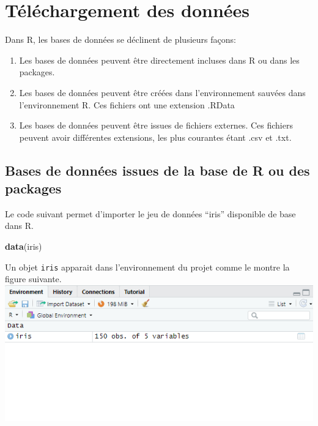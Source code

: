 \documentclass[
]{book}
\newenvironment{Shaded}{\begin{snugshade}}{\end{snugshade}}
\newcommand{\FunctionTok}[1]{\textcolor[rgb]{0.13,0.29,0.53}{\textbf{#1}}}
\newcommand{\NormalTok}[1]{#1}
\providecommand{\tightlist}{%
  \setlength{\itemsep}{0pt}\setlength{\parskip}{0pt}}
\begin{document}
\section{Téléchargement des données}\label{tuxe9luxe9chargement-des-donnuxe9es}

Dans R, les bases de données se déclinent de plusieurs façons:

\begin{enumerate}
\def\labelenumi{\arabic{enumi}.}
\tightlist
\item
  Les bases de données peuvent être directement incluses dans R ou dans les packages.
\item
  Les bases de données peuvent être créées dans l'environnement sauvées dans l'environnement R. Ces fichiers ont une extension .RData
\item
  Les bases de données peuvent être issues de fichiers externes. Ces fichiers peuvent avoir différentes extensions, les plus courantes étant .csv et .txt.
\end{enumerate}

\subsection{Bases de données issues de la base de R ou des packages}\label{bases-de-donnuxe9es-issues-de-la-base-de-r-ou-des-packages}

Le code suivant permet d'importer le jeu de données ``iris'' disponible de base dans R.

\begin{Shaded}
\begin{Highlighting}[]
\FunctionTok{data}\NormalTok{(iris)}
\end{Highlighting}
\end{Shaded}

Un objet \texttt{iris} apparait dans l'environnement du projet comme le montre la figure suivante.
\includegraphics{images/environment_forDataDownload.png}
\end{document}
